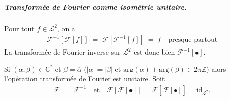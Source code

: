 \subparagraph{Transformée de Fourier comme isométrie unitaire.}

\begin{Theo} Pour tout $f \in \mathcal L^2$, on a 
    \begin{eqnarray}
        \mathcal F^{-1} [ \mathcal F [f]] \; = \; \mathcal F [ \mathcal F^{-1} [f]] \; = \;  f \quad \mbox{presque partout} 
    \end{eqnarray}
    La transformée de Fourier inverse sur $\mathcal L^2$ est donc bien $\mathcal F^{-1}[ \bullet]$.
\end{Theo}

\begin{Prop}
    Si $(\alpha , \beta )\in \mathbb C^\ast $ et $\beta = \overline \alpha $ (\ie $\vert \alpha  \vert = \vert \beta \vert $ et $\mathrm{arg}(\alpha) + \mathrm{arg}(\beta)  \in 2 \pi \mathbb Z $) alors l'opération transformée de Fourier est unitaire. Soit 
    \begin{eqnarray}
        \overline{ \mathcal F} \; = \;  \mathcal F^{-1} \quad \mbox{et} \quad \overline{ \mathcal F}[\mathcal F[\bullet]] =  \mathcal F[\overline{\mathcal F}[\bullet]] = \mathrm{id}_{\mathcal L^2}.
    \end{eqnarray}
\end{Prop}













